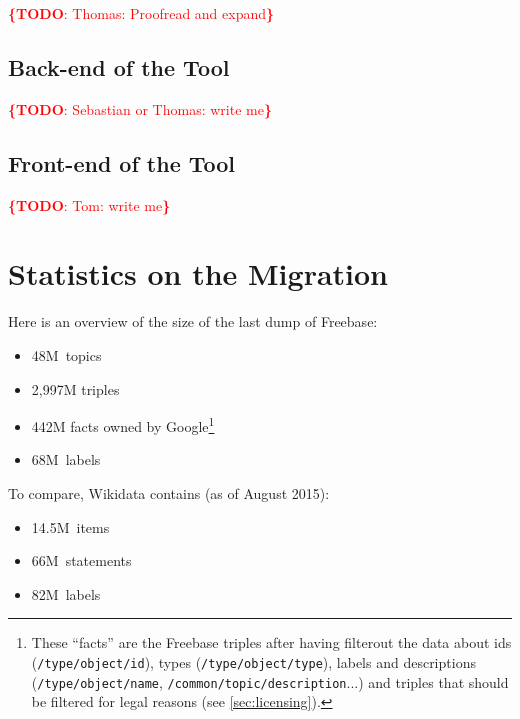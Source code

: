 \documentclass{sig-alternate}
\newcommand{\todo}[1]{\noindent\textcolor{red}{{\bf \{TODO}: #1{\bf \}}}}
\begin{document}
\todo{Thomas: Proofread and expand}

\subsection{Back-end of the Tool}

\todo{Sebastian or Thomas: write me}

\subsection{Front-end of the Tool}

\todo{Tom: write me}

\section{Statistics on the Migration}\label{sec:statistics-of-the-migration}

Here is an overview of the size of the last dump of Freebase:

\begin{itemize}
  \setlength\itemsep{0em}
  \item 48M~topics
  \item 2,997M triples
  \item 442M facts owned by Google\footnote{These ``facts'' are the Freebase triples
      after having filterout the data about ids (\texttt{/type/object/id}),
      types (\texttt{/type/object/type}), labels and descriptions (\texttt{/type/object/name},
      \texttt{/common/topic/description}...) and triples that should be filtered
      for legal reasons (see \autoref{sec:licensing}).}
  \item 68M~labels
\end{itemize}

To compare, Wikidata contains (as of August 2015):

\begin{itemize}
    \setlength\itemsep{0em}
    \item 14.5M~items
    \item 66M~statements
    \item 82M~labels
\end{itemize}
\end{document}
